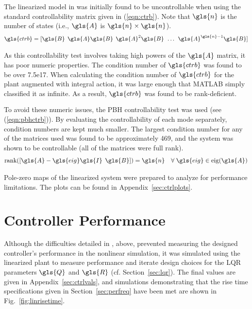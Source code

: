 \documentclass{sydeStyle}
\begin{document}
The linearized model in \cite{spottiswoode} was initially found to be
uncontrollable when using the standard controllability matrix given in
(\ref{eqn:ctrb}).  Note that $\gls{n}$ is the number of states (i.e., $\gls{A}$
is $\gls{n} \times \gls{n}$).
\begin{equation}
    \gls{ctrb} = [\gls{B} \;\, \gls{A}\gls{B} \;\, \gls{A}^2\gls{B} \;\, \ldots
    \;\, \gls{A}^{\gls{n}-1}\gls{B}]
    \label{eqn:ctrb}
\end{equation}

As this controllability test involves taking high powers of the $\gls{A}$
matrix, it has poor numeric properties.  The condition number of $\gls{ctrb}$
was found to be over 7.5e17.  When calculating the condition number of
$\gls{ctrb}$ for the plant augmented with integral action, it was large enough
that MATLAB simply classified it as infinite.  As a result, $\gls{ctrb}$ was
found to be rank-deficient.


To avoid these numeric issues, the PBH controllability test was used (see
(\ref{eqn:pbhctrb})).  By evaluating the controllability of each mode separately,
condition numbers are kept much smaller.  The largest condition number for any
of the matrices used was found to be approximately 469, and the system was shown
to be controllable (all of the matrices were full rank).
\begin{equation}
    \textrm{rank}([\gls{A} - \gls{eig} \gls{I} \;\, \gls{B}]) = \gls{n} \quad
    \forall \; \gls{eig} \in \textrm{eig}(\gls{A})
    \label{eqn:pbhctrb}
\end{equation}

Pole-zero maps of the linearized system were prepared to analyze for performance
limitations.  The plots can be found in Appendix~\ref{sec:ctrlplots}.

\section{Controller Performance}
Although the difficulties detailed in , above, prevented
measuring the designed controller's performance in the nonlinear simulation, it
was simulated using the linearized plant to measure performance and iterate
design choices for the LQR parameters $\gls{Q}$ and $\gls{R}$ (cf.
Section~\ref{sec:lqr}).  The final values are given in
Appendix~\ref{sec:ctrlvals}, and simulations demonstrating that the rise time
specifications given in Section~\ref{sec:perfreq} have been met are shown in
Fig.~\ref{fig:linrisetime}.
\end{document}
